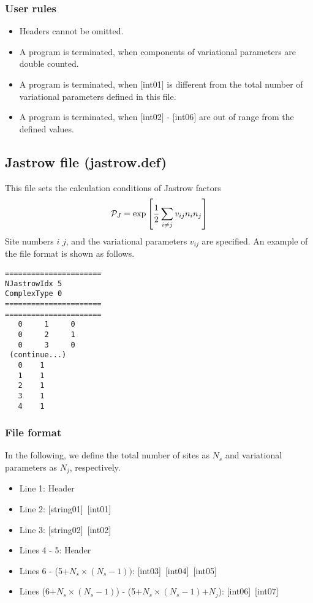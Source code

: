 \subsubsection{User rules}
\begin{itemize}
\item Headers cannot be omitted. 
\item A program is terminated, when components of variational parameters are double counted.
\item A program is terminated, when $[$int01$]$ is different from the total number of variational parameters defined in this file.
\item A program is terminated, when $[$int02$]$ - $[$int06$]$ are out of range from the defined values.
\end{itemize}

\newpage
\subsection{Jastrow file (jastrow.def)}
\label{Subsec:Jastrow}
This file sets the calculation conditions of Jastrow factors 
\begin{equation}
{\cal P}_J=\exp\left[\frac{1}{2} \sum_{i\neq j} v_{ij} n_i n_j\right]
\end{equation}
Site numbers $i$ $j$, and the variational parameters $v_{ij}$ are specified.
An example of the file format is shown as follows.

\begin{minipage}{12.5cm}
\begin{screen}
\begin{verbatim}
======================
NJastrowIdx 5  
ComplexType 0
====================== 
======================
   0     1     0 
   0     2     1 
   0     3     0 
 (continue...)
   0    1 
   1    1 
   2    1 
   3    1 
   4    1 
\end{verbatim}
\end{screen}
\end{minipage}

\subsubsection{File format}
In the following, we define the total number of sites as $N_s$ and variational parameters as $N_j$, respectively.  

 \begin{itemize}
   \item  Line 1: Header
   \item  Line 2: [string01]~[int01]
   \item  Line 3: [string02]~[int02]
   \item  Lines 4 - 5:  Header
   \item  Lines 6 - (5+$N_s\times (N_s-1))$: [int03]~[int04]~[int05]
   \item  Lines (6+$N_s\times (N_s-1)$) - (5+$N_s\times (N_s-1)$+$N_j$): [int06]~[int07]
  \end{itemize}
